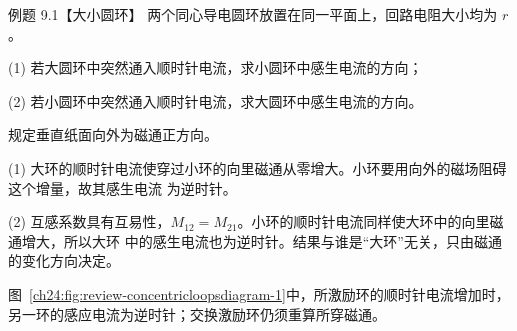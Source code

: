 \begin{origexamplebox}{例题 9.1【大小圆环】}
两个同心导电圆环放置在同一平面上，回路电阻大小均为 $r$。

(1) 若大圆环中突然通入顺时针电流，求小圆环中感生电流的方向；

(2) 若小圆环中突然通入顺时针电流，求大圆环中感生电流的方向。

\begin{center}\end{center}
\label{fig:em24-question-1}
\end{origexamplebox}

\begin{xesolution}
规定垂直纸面向外为磁通正方向。

(1) 大环的顺时针电流使穿过小环的向里磁通从零增大。小环要用向外的磁场阻碍这个增量，故其感生电流
为逆时针。

(2) 互感系数具有互易性，$M_{12}=M_{21}$。小环的顺时针电流同样使大环中的向里磁通增大，所以大环
中的感生电流也为逆时针。结果与谁是“大环”无关，只由磁通的变化方向决定。

图~\ref{ch24:fig:review-concentricloopsdiagram-1}中，所激励环的顺时针电流增加时，另一环的感应电流为逆时针；交换激励环仍须重算所穿磁通。
\par\noindent\begin{minipage}{\linewidth}
\concentricLoopsDiagram
{}\label{ch24:fig:review-concentricloopsdiagram-1}
\end{minipage}\par\medskip
\end{xesolution}

